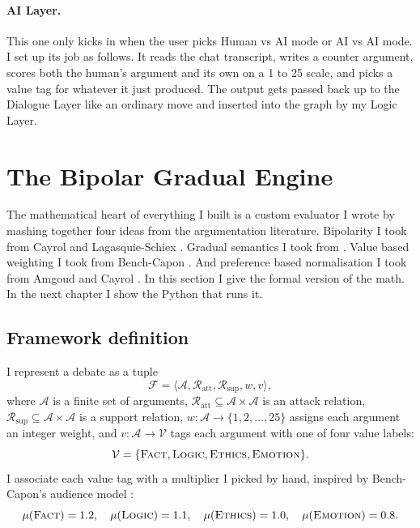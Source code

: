 \paragraph{AI Layer.}
This one only kicks in when the user picks Human vs AI mode or AI vs AI mode. I set up its job as follows. It reads the chat transcript, writes a counter argument, scores both the human's argument and its own on a 1 to 25 scale, and picks a value tag for whatever it just produced. The output gets passed back up to the Dialogue Layer like an ordinary move and inserted into the graph by my Logic Layer.

\section{The Bipolar Gradual Engine}
\label{sec:bipolar_engine}
The mathematical heart of everything I built is a custom evaluator I wrote by mashing together four ideas from the argumentation literature. Bipolarity I took from Cayrol and Lagasquie-Schiex \cite{cayrol2005bipolar}. Gradual semantics I took from \cite{cayrol2005graduality, amgoud2017gradual}. Value based weighting I took from Bench-Capon \cite{benchcapon2003value}. And preference based normalisation I took from Amgoud and Cayrol \cite{amgoud2002reasoning}. In this section I give the formal version of the math. In the next chapter I show the Python that runs it.

\subsection{Framework definition}
I represent a debate as a tuple
\[
\mathcal{F} = \langle \mathcal{A}, \mathcal{R}_{\text{att}}, \mathcal{R}_{\text{sup}}, w, v \rangle,
\]
where $\mathcal{A}$ is a finite set of arguments, $\mathcal{R}_{\text{att}} \subseteq \mathcal{A} \times \mathcal{A}$ is an attack relation, $\mathcal{R}_{\text{sup}} \subseteq \mathcal{A} \times \mathcal{A}$ is a support relation, $w : \mathcal{A} \rightarrow \{1, 2, \dots, 25\}$ assigns each argument an integer weight, and $v : \mathcal{A} \rightarrow \mathcal{V}$ tags each argument with one of four value labels:
\[
\mathcal{V} = \{\textsc{Fact}, \textsc{Logic}, \textsc{Ethics}, \textsc{Emotion}\}.
\]
I associate each value tag with a multiplier I picked by hand, inspired by Bench-Capon's audience model \cite{benchcapon2003value}:
\[
\mu(\textsc{Fact})=1.2, \quad \mu(\textsc{Logic})=1.1, \quad \mu(\textsc{Ethics})=1.0, \quad \mu(\textsc{Emotion})=0.8.
\]

